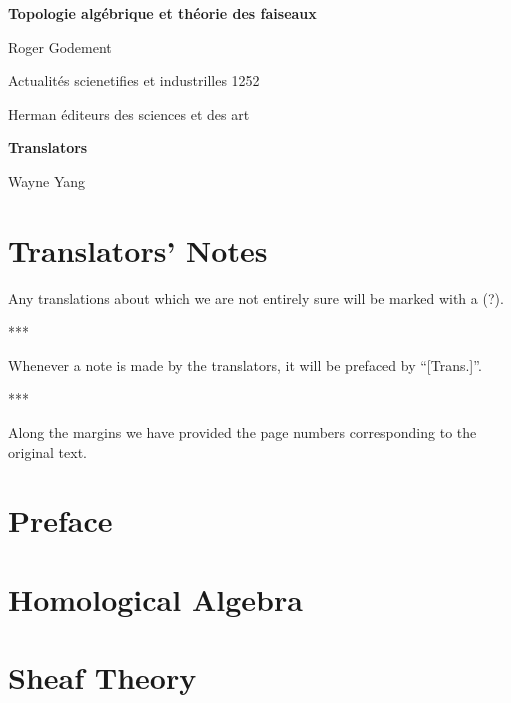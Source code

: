 \documentclass[openany,oneside]{amsbook}
\theoremstyle{ega-env-style}
\theoremstyle{ega-thm-env-style}
\theoremstyle{ega-defn-env-style}
\def\unsure#1{#1 {\color{red}(?)}}
\def\sectionbreak{\begin{center}***\end{center}}
\begin{document}
\begin{titlepage}
\pagestyle{empty}
\setcounter{page}{1}
\centerline{\LARGE\bfseries Topologie alg\'ebrique et th\'eorie des faiseaux}
\vskip0.5in
\noindent
\centerline{Roger Godement}
\centerline{Actualit\'es scienetifies et industrilles 1252}
\centerline{Herman \'editeurs des sciences et des art}
\vskip0.5in
\noindent
\centerline{\bfseries Translators}
\centerline{Wayne Yang}
\end{titlepage}
\setcounter{tocdepth}{2}
\tableofcontents

\label{section:Trasnote}
\chapter*{Translators' Notes}

\unsure{Any translations about which we are not entirely sure will be marked with a}.

\sectionbreak

Whenever a note is made by the translators, it will be prefaced by ``[Trans.]''.

\sectionbreak

Along the margins we have provided the page numbers corresponding to the original text.

\chapter*{Preface}

\label{section:preface}



\chapter{Homological Algebra}

\label{section:tatf1}


\chapter{Sheaf Theory}

\label{section:tatf2}




\end{document}
